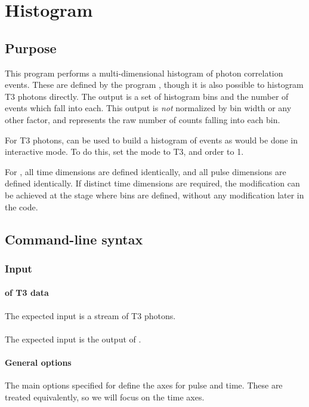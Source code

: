 \section{Histogram}
\label{sec:histogram}

\subsection{Purpose}
This program performs a multi-dimensional histogram of photon correlation events. These are defined by the program , though it is also possible to histogram T3 photons directly. The output is a set of histogram bins and the number of events which fall into each. This output is \textit{not} normalized by bin width or any other factor, and represents the raw number of counts falling into each bin.

For T3 photons,  can be used to build a histogram of events as would be done in interactive mode. To do this, set the mode to T3, and order to 1.

For , all time dimensions are defined identically, and all pulse dimensions are defined identically. If distinct time dimensions are required, the modification can be achieved at the stage where bins are defined, without any modification later in the code.

\subsection{Command-line syntax}
%

\subsubsection{Input}
\paragraph{ of T3 data}
The expected input is a stream of T3 photons.

\paragraph{}
The expected input is the output of .

\paragraph{General options}
The main options specified for  define the axes for pulse and time. These are treated equivalently, so we will focus on the time axes.

